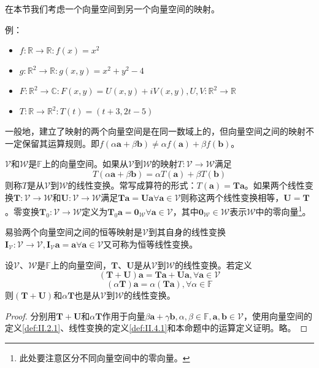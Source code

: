 \documentclass[main.tex]{subfiles}
\begin{document}
在本节我们考虑一个向量空间到另一个向量空间的映射。

例：
\begin{itemize}
    \item $f:\mathbb{R}\rightarrow\mathbb{R}:f\left(x\right)=x^2$
    \item $g:\mathbb{R}^2\rightarrow\mathbb{R}:g\left(x,y\right)=x^2+y^2-4$
    \item $F:\mathbb{R}^2\rightarrow\mathbb{C}:F\left(x,y\right)=U\left(x,y\right)+iV\left(x,y\right),U,V:\mathbb{R}^2\rightarrow\mathbb{R}$
    \item $T:\mathbb{R}\rightarrow\mathbb{R}^2:T\left(t\right)=\left(t+3,2t-5\right)$
\end{itemize}

一般地，建立了映射的两个向量空间是在同一数域上的，但向量空间之间的映射不一定保留其运算规则。即$f\left(\alpha\mathbf{a}+\beta\mathbf{b}\right)\neq\alpha f\left(\mathbf{a}\right)+\beta f\left(\mathbf{b}\right)$。

\begin{definition}[线性变换]\label{def:II.4.1}
$\mathcal{V}$和$\mathcal{W}$是$\mathbb{F}$上的向量空间。如果从$\mathcal{V}$到$\mathcal{W}$的映射$T:\mathcal{V}\rightarrow\mathcal{W}$满足
\[T\left(\alpha\mathbf{a}+\beta\mathbf{b}\right)=\alpha T\left(\mathbf{a}\right)+\beta T\left(\mathbf{b}\right)\]
则称$T$是从$\mathcal{V}$到$\mathcal{W}$的线性变换。常写成算符的形式：$T\left(\mathbf{a}\right)=\mathbf{Ta}$。如果两个线性变换$\mathbf{T}:\mathcal{V}\rightarrow\mathcal{W}$和$\mathbf{U}:\mathcal{V}\rightarrow\mathcal{W}$满足$\mathbf{Ta}=\mathbf{Ua}\forall\mathbf{a}\in\mathcal{V}$则称这两个线性变换相等，$\mathbf{U}=\mathbf{T}$。零变换$\mathbf{T}_0:\mathcal{V}\rightarrow\mathcal{W}$定义为$\mathbf{T}_0\mathbf{a}=\mathbf{0}_\mathcal{W}\forall\mathbf{a}\in\mathcal{V}$，其中$\mathbf{0}_\mathcal{W}\in\mathcal{W}$表示$\mathcal{W}$中的零向量\footnote{此处要注意区分不同向量空间中的零向量。}。
\end{definition}

易验两个向量空间之间的恒等映射是$\mathcal{V}$到其自身的线性变换$\mathbf{I}_\mathcal{V}:\mathcal{V}\rightarrow\mathcal{V},\mathbf{I}_\mathcal{V}\mathbf{a}=\mathbf{a}\forall\mathbf{a}\in\mathcal{V}$又可称为恒等线性变换。

\begin{theorem}\label{thm:II.4.1}
设$\mathcal{V}$、$\mathcal{W}$是$\mathbb{F}$上的向量空间，$\mathbf{T}$、$\mathbf{U}$是从$\mathcal{V}$到$\mathcal{W}$的线性变换。若定义
\[\left(\mathbf{T}+\mathbf{U}\right)\mathbf{a}=\mathbf{Ta}+\mathbf{Ua},\forall\mathbf{a}\in\mathcal{V}\]
\[\left(\alpha\mathbf{T}\right)\mathbf{a}=\alpha\left(\mathbf{Ta}\right),\forall\alpha\in\mathbb{F}\]
则$\left(\mathbf{T}+\mathbf{U}\right)$和$\alpha\mathbf{T}$也是从$\mathcal{V}$到$\mathcal{W}$的线性变换。
\end{theorem}
\begin{proof}
分别用$\mathbf{T}+\mathbf{U}$和$\alpha\mathbf{T}$作用于向量$\beta\mathbf{a}+\gamma\mathbf{b},\alpha,\beta\in\mathbb{F},\mathbf{a},\mathbf{b}\in\mathcal{V}$，使用向量空间的定义\ref{def:II.2.1}、线性变换的定义\ref{def:II.4.1}和本命题中的运算定义证明。略。
\end{proof}
\end{document}
